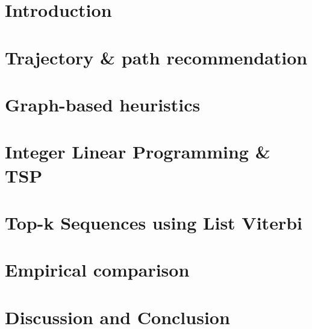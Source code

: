 \documentclass[sigconf]{acmart}
\begin{document}



\begin{abstract}

\end{abstract}

%
%


\maketitle

\section{Introduction}


\section{Trajectory \& path recommendation}
\label{sec:background}


\section{Graph-based heuristics}
\label{sec:heuristics}


\section{Integer Linear Programming \& TSP}
\label{sec:ilp}


\section{Top-k Sequences using List Viterbi}
\label{sec:viterbi}


%

\section{Empirical comparison}
\label{sec:experiments}


\section{Discussion and Conclusion}
\label{sec:discussion}




 
\end{document}
